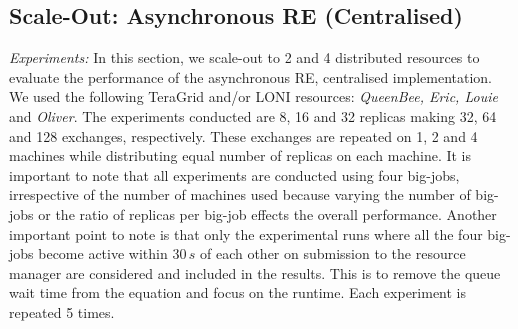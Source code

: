 \documentclass{rspublic}
\newcommand{\alnote}[1]{ {\textcolor{blue} { ***andre: #1 }}}
\newcommand{\alnote}[1]{}
\begin{document}
\subsection{Scale-Out: Asynchronous RE (Centralised)}
{\it Experiments:} In this section, we scale-out to 2 and 4 distributed resources to evaluate the performance of the asynchronous RE, centralised implementation.
We used the following TeraGrid and/or LONI resources: \emph{QueenBee,
  Eric, Louie} and \emph{Oliver}. The experiments conducted are 8, 16
and 32 replicas making 32, 64 and 128 exchanges, respectively. These exchanges are
repeated on 1, 2 and 4 machines while distributing equal number of
replicas on each machine. It is important to note that all
experiments are conducted using four big-jobs, irrespective of the
number of machines used because varying the number of big-jobs or the
ratio of replicas per big-job effects the overall performance.  Another
important point to note is that only the experimental runs where all
the four big-jobs %
become active within $30\,s$ of each other on
submission to the resource manager are considered and included in the
results. This is to remove the queue wait time from the equation and
focus on the runtime. Each experiment is repeated 5 times.

%
\end{document}
